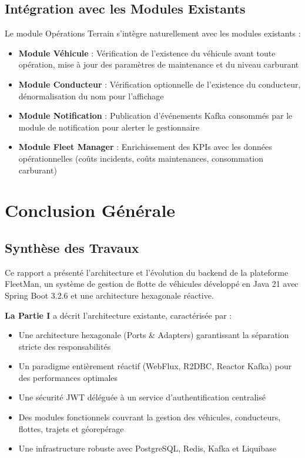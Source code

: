 \documentclass[12pt,a4paper]{report}
\begin{document}
\section{Intégration avec les Modules Existants}

Le module Opérations Terrain s'intègre naturellement avec les modules existants :

\begin{itemize}[leftmargin=2cm]
  \item \textbf{Module Véhicule} : Vérification de l'existence du véhicule avant toute opération, mise à jour des paramètres de maintenance et du niveau carburant
  \item \textbf{Module Conducteur} : Vérification optionnelle de l'existence du conducteur, dénormalisation du nom pour l'affichage
  \item \textbf{Module Notification} : Publication d'événements Kafka consommés par le module de notification pour alerter le gestionnaire
  \item \textbf{Module Fleet Manager} : Enrichissement des KPIs avec les données opérationnelles (coûts incidents, coûts maintenances, consommation carburant)
\end{itemize}

\chapter*{Conclusion Générale}
\thispagestyle{fancy}

\section*{Synthèse des Travaux}

Ce rapport a présenté l'architecture et l'évolution du backend de la plateforme FleetMan, un système de gestion de flotte de véhicules développé en Java 21 avec Spring Boot 3.2.6 et une architecture hexagonale réactive.

\textbf{La Partie I} a décrit l'architecture existante, caractérisée par :
\begin{itemize}[leftmargin=2cm]
  \item Une architecture hexagonale (Ports \& Adapters) garantissant la séparation stricte des responsabilités
  \item Un paradigme entièrement réactif (WebFlux, R2DBC, Reactor Kafka) pour des performances optimales
  \item Une sécurité JWT déléguée à un service d'authentification centralisé
  \item Des modules fonctionnels couvrant la gestion des véhicules, conducteurs, flottes, trajets et géorepérage
  \item Une infrastructure robuste avec PostgreSQL, Redis, Kafka et Liquibase
\end{itemize}
\end{document}
